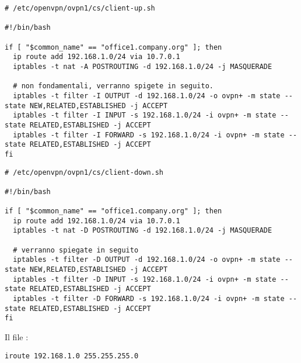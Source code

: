\begin{verbatim}
# /etc/openvpn/ovpn1/cs/client-up.sh

#!/bin/bash

if [ "$common_name" == "office1.company.org" ]; then
  ip route add 192.168.1.0/24 via 10.7.0.1
  iptables -t nat -A POSTROUTING -d 192.168.1.0/24 -j MASQUERADE

  # non fondamentali, verranno spigete in seguito.
  iptables -t filter -I OUTPUT -d 192.168.1.0/24 -o ovpn+ -m state --state NEW,RELATED,ESTABLISHED -j ACCEPT
  iptables -t filter -I INPUT -s 192.168.1.0/24 -i ovpn+ -m state --state RELATED,ESTABLISHED -j ACCEPT
  iptables -t filter -I FORWARD -s 192.168.1.0/24 -i ovpn+ -m state --state RELATED,ESTABLISHED -j ACCEPT
fi
\end{verbatim}

\begin{verbatim}
# /etc/openvpn/ovpn1/cs/client-down.sh

#!/bin/bash

if [ "$common_name" == "office1.company.org" ]; then
  ip route add 192.168.1.0/24 via 10.7.0.1
  iptables -t nat -D POSTROUTING -d 192.168.1.0/24 -j MASQUERADE

  # verranno spiegate in seguito
  iptables -t filter -D OUTPUT -d 192.168.1.0/24 -o ovpn+ -m state --state NEW,RELATED,ESTABLISHED -j ACCEPT
  iptables -t filter -D INPUT -s 192.168.1.0/24 -i ovpn+ -m state --state RELATED,ESTABLISHED -j ACCEPT
  iptables -t filter -D FORWARD -s 192.168.1.0/24 -i ovpn+ -m state --state RELATED,ESTABLISHED -j ACCEPT
fi
\end{verbatim}
Il file :
\begin{verbatim}
iroute 192.168.1.0 255.255.255.0
\end{verbatim}

